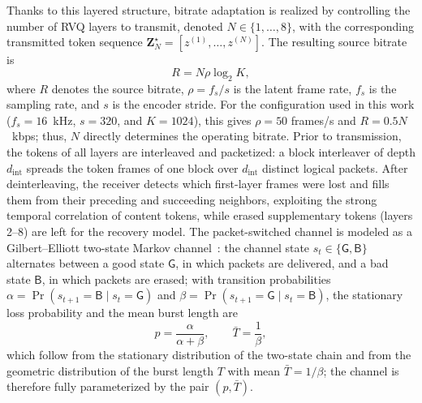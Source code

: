 \documentclass[lettersize,journal]{IEEEtran}
\begin{document}
\par Thanks to this layered structure, bitrate adaptation is realized by controlling the number of RVQ layers to transmit, denoted $N\in\{1,\ldots,8\}$, with the corresponding transmitted token sequence $\mathbf{Z}^{\star}_{N}=[z^{(1)},\ldots,z^{(N)}]$. The resulting source bitrate is
\begin{equation}
R=N\rho\log_2 K,
\end{equation}
where $R$ denotes the source bitrate, $\rho=f_s/s$ is the latent frame rate, $f_s$ is the sampling rate, and $s$ is the encoder stride. For the configuration used in this work ($f_s=16$~kHz, $s=320$, and $K=1024$), this gives $\rho=50$ frames/s and $R=0.5N$~kbps; thus, $N$ directly determines the operating bitrate. Prior to transmission, the tokens of all layers are interleaved and packetized: a block interleaver of depth $d_{\mathrm{int}}$ spreads the token frames of one block over $d_{\mathrm{int}}$ distinct logical packets. After deinterleaving, the receiver detects which first-layer frames were lost and fills them from their preceding and succeeding neighbors, exploiting the strong temporal correlation of content tokens, while erased supplementary tokens (layers 2--8) are left for the recovery model. The packet-switched channel is modeled as a Gilbert--Elliott two-state Markov channel~\cite{gilbert1960,elliott1963}: the channel state $s_{t}\in\{\mathsf{G},\mathsf{B}\}$ alternates between a good state $\mathsf{G}$, in which packets are delivered, and a bad state $\mathsf{B}$, in which packets are erased; with transition probabilities $\alpha=\Pr(s_{t+1}=\mathsf{B}\mid s_t=\mathsf{G})$ and $\beta=\Pr(s_{t+1}=\mathsf{G}\mid s_t=\mathsf{B})$, the stationary loss probability and the mean burst length are
\begin{equation}
p=\frac{\alpha}{\alpha+\beta},\qquad \bar{T}=\frac{1}{\beta},
\label{eq:ge}
\end{equation}
which follow from the stationary distribution of the two-state chain and from the geometric distribution of the burst length $T$ with mean $\bar{T}=1/\beta$; the channel is therefore fully parameterized by the pair $(p,\bar{T})$.
\end{document}
